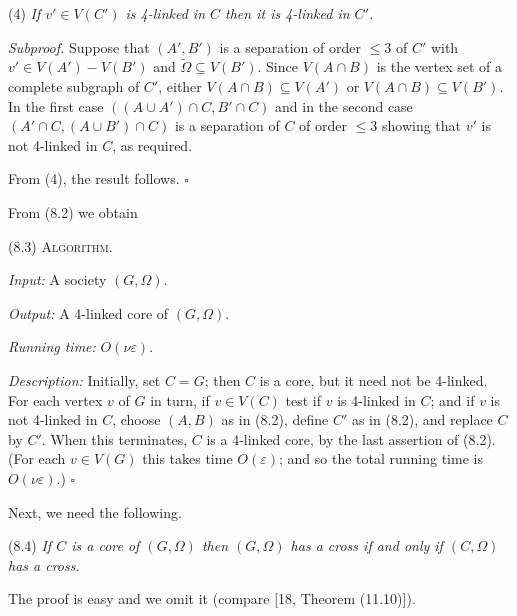 \hspace*{12pt}(4) \textit{If $v' \in V(C')$ is 4-linked in $C$ then it is 4-linked in $C'$.}

\textit{Subproof.} Suppose that $(A', B')$ is a separation of order $\le 3$ of $C'$ with $v' \in V(A') - V(B')$ and $\tilde{\Omega} \subseteq V(B')$. Since $V(A \cap B)$ is the vertex set of a complete subgraph of $C'$, either $V(A \cap B) \subseteq V(A')$ or $V(A \cap B) \subseteq V(B')$. In the first case $((A \cup A') \cap C, B' \cap C)$ and in the second case $(A' \cap C, (A \cup B') \cap C)$ is a separation of $C$ of order $\le 3$ showing that $v'$ is not 4-linked in $C$, as required.

From (4), the result follows. $\square$

From (8.2) we obtain

\stmt
(8.3) \textsc{Algorithm}.

\textit{Input:} A society $(G, \Omega)$.

\textit{Output:} A 4-linked core of $(G, \Omega)$.

\textit{Running time:} $O(\nu\varepsilon)$.

\textit{Description:} Initially, set $C = G$; then $C$ is a core, but it need not be 4-linked. For each vertex $v$ of $G$ in turn, if $v \in V(C)$ test if $v$ is 4-linked in $C$; and if $v$ is not 4-linked in $C$, choose $(A, B)$ as in (8.2), define $C'$ as in (8.2), and replace $C$ by $C'$. When this terminates, $C$ is a 4-linked core, by the last assertion of (8.2). (For each $v \in V(G)$ this takes time $O(\varepsilon)$; and so the total running time is $O(\nu\varepsilon)$.) $\square$

Next, we need the following.

\stmt
(8.4) \textit{If $C$ is a core of $(G, \Omega)$ then $(G, \Omega)$ has a cross if and only if $(C, \Omega)$ has a cross.}

The proof is easy and we omit it (compare [18, Theorem (11.10)]).

